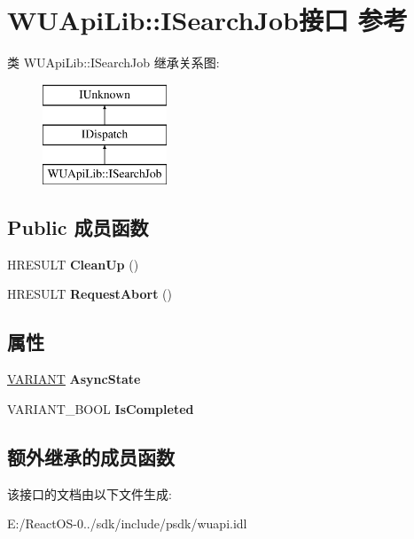 \hypertarget{interface_w_u_api_lib_1_1_i_search_job}{}\section{W\+U\+Api\+Lib\+:\+:I\+Search\+Job接口 参考}
\label{interface_w_u_api_lib_1_1_i_search_job}
类 W\+U\+Api\+Lib\+:\+:I\+Search\+Job 继承关系图\+:\begin{figure}[H]
\begin{center}
\leavevmode
\includegraphics[height=3.000000cm]{interface_w_u_api_lib_1_1_i_search_job}
\end{center}
\end{figure}
\subsection*{Public 成员函数}
\begin{DoxyCompactItemize}
\item 
\mbox{\label{interface_w_u_api_lib_1_1_i_search_job_a8502faa663b6721b1acd2c147e5ab4f6}} 
H\+R\+E\+S\+U\+LT {\bfseries Clean\+Up} ()
\item 
\mbox{\label{interface_w_u_api_lib_1_1_i_search_job_a0beae3b4e224d7e175b0e4c8f1c8300c}} 
H\+R\+E\+S\+U\+LT {\bfseries Request\+Abort} ()
\end{DoxyCompactItemize}
\subsection*{属性}
\begin{DoxyCompactItemize}
\item 
\mbox{\label{interface_w_u_api_lib_1_1_i_search_job_a41a511f80e6d8b2c4d15a507a5803e3b}} 
\hyperlink{structtag_v_a_r_i_a_n_t}{V\+A\+R\+I\+A\+NT} {\bfseries Async\+State}
\item 
\mbox{\label{interface_w_u_api_lib_1_1_i_search_job_ace1c993b5c4b07a09f64bdf911abe768}} 
V\+A\+R\+I\+A\+N\+T\+\_\+\+B\+O\+OL {\bfseries Is\+Completed}
\end{DoxyCompactItemize}
\subsection*{额外继承的成员函数}


该接口的文档由以下文件生成\+:\begin{DoxyCompactItemize}
\item 
E\+:/\+React\+O\+S-\/0../sdk/include/psdk/wuapi.\+idl\end{DoxyCompactItemize}
